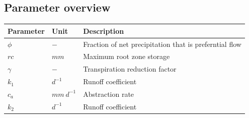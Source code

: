 \newpage
\subsection{Parameter overview}
\begin{table}[htbp]
  \centering
    \begin{tabular}{lll}
    \toprule
    Parameter & Unit  & Description \\
    \midrule
    $\phi$ & $-$   & Fraction of net precipitation that is preferntial flow \\
    $rc$  & $mm$  & Maximum root zone storage \\
    $\gamma$ & $-$   & Transpiration reduction factor \\
    $k_1$ & $d^{-1}$ & Runoff coefficient \\
    $c_a$ & $mm~d^{-1}$ & Abstraction rate \\
    $k_2$ & $d^{-1}$ & Runoff coefficient \\
    \bottomrule
    \end{tabular}%
  \label{tab:addlabel}%
\end{table}%

